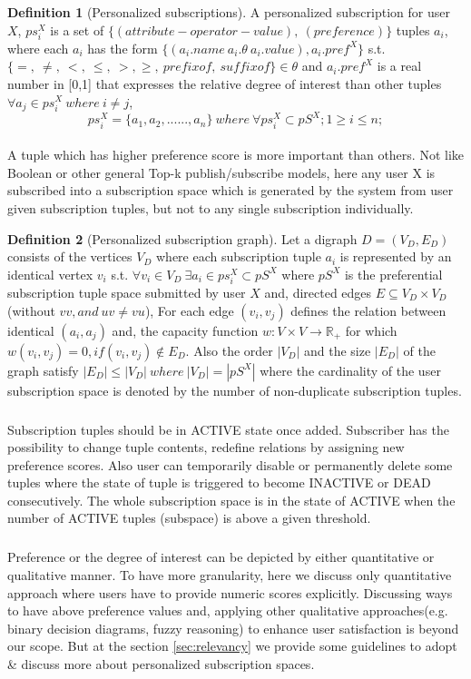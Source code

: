 \documentclass[a4paper,12pt,oneside]{book}
\theoremstyle{definition}
\newtheorem{definition}{Definition}[section]
\theoremstyle{remark}
\begin{document}
\begin{definition}[Personalized subscriptions]
A personalized subscription for user $X$, $ps_i^X$ is a set of $\{(attribute-operator-value),\ (preference)\}$ tuples $a_i$, where each $a_i$ has the form $\{(a_i.name\ a_i.\theta \ a_i.value), a_i.pref^X \}$ s.t. $\{=,\ \neq,\ <,\ \leq,\ >, \geq,\ prefix of,\ suffix of\} \in \theta $ and $a_i.pref^X$ is a real number in [0,1] that expresses the relative degree of interest than other tuples $\forall a_j \in ps_i^X\ where\ i \neq j$,
\[ ps_i^X =\{ a_1, a_2,......,a_n \}\ where\ \forall ps_i^X \subset pS^X; 1 \geq i \leq n;\]
\end{definition}
\paragraph*{}
A tuple which has higher preference score is more important than others. Not like Boolean or other general Top-k publish/subscribe models, here any user X is subscribed into a subscription space which is generated by the system from user given subscription tuples, but not to any single subscription individually.

\begin{definition}[Personalized subscription graph]
\label{def:persubgraph}
Let a digraph $D=(V_D,E_D)$ consists of the vertices $V_D$ where each subscription tuple $a_i$ is represented by an identical vertex $v_i$ s.t. $ \forall v_i \in V_D\ \exists a_i \in ps_i^X \subset pS^X$ where $pS^X$ is the preferential subscription tuple space submitted by user $X$ and, directed edges $E \subseteq V_D \times V_D$ (without $vv, and\ uv\neq vu$), For each edge $(v_i,v_j)$ defines the relation between identical $(a_i,a_j)$ and, the capacity function $w:V\times V \rightarrow \mathbb{R_+}$ for which $w(v_i,v_j)=0, if (v_i,v_j) \notin E_D $. Also the order $|V_D|$ and the size $|E_D|$ of the graph satisfy $|E_D| \leq |V_D|\ where\ |V_D|=|pS^X|$ where the cardinality of the user subscription space is denoted by the number of non-duplicate subscription tuples.
\end{definition}

\subparagraph*{} 
Subscription tuples should be in ACTIVE state once added. Subscriber has the possibility to change tuple contents, redefine relations by assigning new preference scores. Also user can temporarily disable or permanently delete some tuples where the state of tuple is triggered to become INACTIVE or DEAD consecutively. The whole subscription space is in the state of ACTIVE when the number of ACTIVE tuples (subspace) is above a given threshold.
\subparagraph*{}
Preference or the degree of interest can be depicted by either quantitative or qualitative manner. To have more granularity, here we discuss only quantitative approach where users have to provide numeric scores explicitly. Discussing ways to have above preference values and, applying other qualitative approaches(e.g. binary decision diagrams, fuzzy reasoning) to enhance user satisfaction is beyond our scope. But at the section \ref{sec:relevancy} we provide some guidelines to adopt \& discuss more about personalized subscription spaces.
\end{document}
